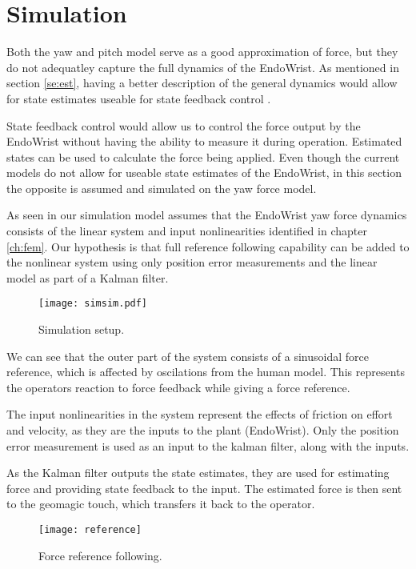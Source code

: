 \section{Simulation}
Both the yaw and pitch model serve as a good approximation of force, but they do not adequatley capture the full dynamics of the EndoWrist.
As mentioned in section \ref{se:est}, having a better description of the general dynamics would allow for state estimates useable for state feedback control \cite{yue2004state}.

State feedback control would allow us to control the force output by the EndoWrist without having the ability to measure it during operation.
Estimated states can be used to calculate the force being applied.
Even though the current models do not allow for useable state estimates of the EndoWrist, in this section the opposite is assumed and simulated on the yaw force model.

As seen in  our simulation model assumes that the EndoWrist yaw force dynamics consists of the linear system and input nonlinearities identified in chapter \ref{ch:fem}.
Our hypothesis is that full reference following capability can be added to the nonlinear system using only position error measurements and the linear model as part of a Kalman filter.

\begin{figure}[H]\label{mdle}
\centering
\texttt{[image: simsim.pdf]}
\caption{Simulation setup.}
\end{figure}

We can see that the outer part of the system consists of a sinusoidal force reference, which is affected by oscilations from the human model. 
This represents the operators reaction to force feedback while giving a force reference.

The input nonlinearities in the system represent the effects of friction on effort and velocity, as they are the inputs to the plant (EndoWrist).
Only the position error measurement is used as an input to the kalman filter, along with the inputs.

As the Kalman filter outputs the state estimates, they are used for estimating force and providing state feedback to the input.
The estimated force is then sent to the geomagic touch, which transfers it back to the operator.

\begin{figure}[H]
\centering
\hspace{-2.5em}\texttt{[image: reference]}
\caption{Force reference following.}
\label{fig:freffl}
\end{figure}

